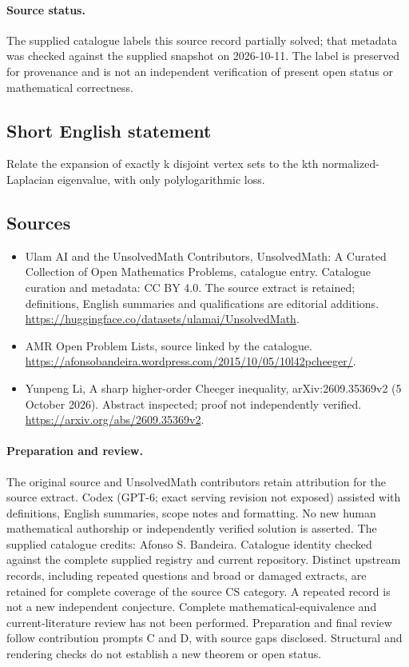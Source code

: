\documentclass[11pt]{article}
\begin{document}
\paragraph{Source status.}
The supplied catalogue labels this source record partially solved; that metadata was checked against the supplied snapshot on 2026-10-11. The label is preserved for provenance and is not an independent verification of present open status or mathematical correctness.
\subsection{Short English statement}
Relate the expansion of exactly k disjoint vertex sets to the kth normalized-Laplacian eigenvalue, with only polylogarithmic loss.
\subsection{Sources}
\begin{itemize}
\item[\hypertarget{source:statement:1}{S1}] Ulam AI and the UnsolvedMath Contributors, UnsolvedMath: A Curated Collection of Open Mathematics Problems, catalogue entry. Catalogue curation and metadata: CC BY 4.0. The source extract is retained; definitions, English summaries and qualifications are editorial additions.
\url{https://huggingface.co/datasets/ulamai/UnsolvedMath}.
\item[\hypertarget{source:statement:2}{S2}] AMR Open Problem Lists, source linked by the catalogue.
\url{https://afonsobandeira.wordpress.com/2015/10/05/10l42pcheeger/}.
\item[\hypertarget{source:statement:3}{S3}] Yunpeng Li, A sharp higher-order Cheeger inequality, arXiv:2609.35369v2 (5 October 2026). Abstract inspected; proof not independently verified.
\url{https://arxiv.org/abs/2609.35369v2}.
\end{itemize}
\paragraph{Preparation and review.}
The original source and UnsolvedMath contributors retain attribution for the source extract. Codex (GPT-6; exact serving revision not exposed) assisted with definitions, English summaries, scope notes and formatting. No new human mathematical authorship or independently verified solution is asserted. The supplied catalogue credits: Afonso S. Bandeira. Catalogue identity checked against the complete supplied registry and current repository. Distinct upstream records, including repeated questions and broad or damaged extracts, are retained for complete coverage of the source CS category. A repeated record is not a new independent conjecture. Complete mathematical-equivalence and current-literature review has not been performed. Preparation and final review follow contribution prompts C and D, with source gaps disclosed. Structural and rendering checks do not establish a new theorem or open status.
\label{end:statement}
\end{document}
